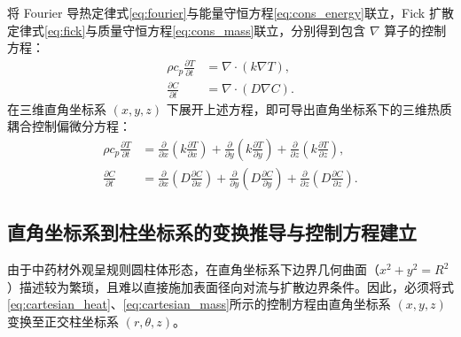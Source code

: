 \documentclass[12pt,a4paper]{ctexart}
\begin{document}
将 Fourier 导热定律式\eqref{eq:fourier}与能量守恒方程\eqref{eq:cons_energy}联立，Fick 扩散定律式\eqref{eq:fick}与质量守恒方程\eqref{eq:cons_mass}联立，分别得到包含 $\nabla$ 算子的控制方程：
\begin{align}
\rho c_p\frac{\partial T}{\partial t} &= \nabla\cdot(k\nabla T),\label{eq:div_heat}\\
\frac{\partial C}{\partial t} &= \nabla\cdot(D\nabla C).\label{eq:div_mass}
\end{align}
在三维直角坐标系 $(x,y,z)$ 下展开上述方程，即可导出直角坐标系下的三维热质耦合控制偏微分方程：
\begin{align}
\rho c_p\frac{\partial T}{\partial t}
&=\frac{\partial}{\partial x}\left(k\frac{\partial T}{\partial x}\right)
+\frac{\partial}{\partial y}\left(k\frac{\partial T}{\partial y}\right)
+\frac{\partial}{\partial z}\left(k\frac{\partial T}{\partial z}\right),\label{eq:cartesian_heat}\\
\frac{\partial C}{\partial t}
&=\frac{\partial}{\partial x}\left(D\frac{\partial C}{\partial x}\right)
+\frac{\partial}{\partial y}\left(D\frac{\partial C}{\partial y}\right)
+\frac{\partial}{\partial z}\left(D\frac{\partial C}{\partial z}\right).\label{eq:cartesian_mass}
\end{align}

\subsection{直角坐标系到柱坐标系的变换推导与控制方程建立}
由于中药材外观呈规则圆柱体形态，在直角坐标系下边界几何曲面（$x^2+y^2=R^2$）描述较为繁琐，且难以直接施加表面径向对流与扩散边界条件。因此，必须将式\eqref{eq:cartesian_heat}、\eqref{eq:cartesian_mass}所示的控制方程由直角坐标系 $(x,y,z)$ 变换至正交柱坐标系 $(r,\theta,z)$。
\end{document}
